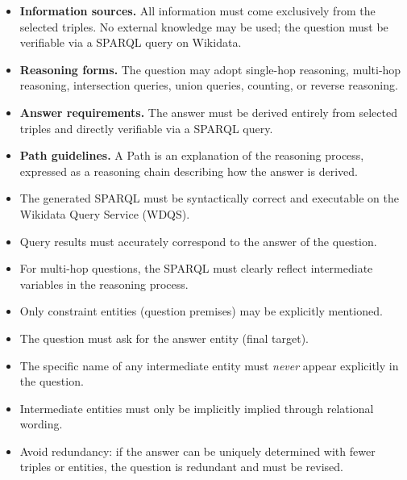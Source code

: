 \begin{table}[t!]
\begin{minipage}{\textwidth}
\begin{mdframed}[style=outerframe]
\begin{mdframed}[style=subframe]
\vspace{4pt}
\begin{itemize}[leftmargin=*, labelindent=0pt, labelsep=0.6em, itemsep=1pt, topsep=2pt]
  \small
  \item \textbf{Information sources.} All information must come exclusively from the selected triples. No external knowledge may be used; the question must be verifiable via a SPARQL query on Wikidata.
  \item \textbf{Reasoning forms.} The question may adopt single-hop reasoning, multi-hop reasoning, intersection queries, union queries, counting, or reverse reasoning.
  \item \textbf{Answer requirements.} The answer must be derived entirely from selected triples and directly verifiable via a SPARQL query.
  \item \textbf{Path guidelines.} A Path is an explanation of the reasoning process, expressed as a reasoning chain describing how the answer is derived.
\end{itemize}

\vspace{4pt}
\begin{itemize}[leftmargin=*, labelindent=0pt, labelsep=0.6em, itemsep=1pt, topsep=2pt]
  \small
  \item The generated SPARQL must be syntactically correct and executable on the Wikidata Query Service (WDQS).
  \item Query results must accurately correspond to the answer of the question.
  \item For multi-hop questions, the SPARQL must clearly reflect intermediate variables in the reasoning process.
\end{itemize}

\vspace{4pt}
\begin{itemize}[leftmargin=*, labelindent=0pt, labelsep=0.6em, itemsep=1pt, topsep=2pt]
  \small
  \item[$\checkmark$] Only constraint entities (question premises) may be explicitly mentioned.
  \item[$\checkmark$] The question must ask for the answer entity (final target).
  \item[$\times$] The specific name of any intermediate entity must \textit{never} appear explicitly in the question.
  \item[$\times$] Intermediate entities must only be implicitly implied through relational wording.
  \item[$\times$] Avoid redundancy: if the answer can be uniquely determined with fewer triples or entities, the question is redundant and must be revised.
\end{itemize}


\end{mdframed}
\end{mdframed}
\end{minipage}
\end{table}

